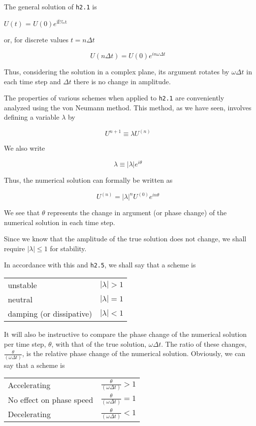 The general solution of \texttt{h2.1} is

\(U\left( t \right)\) = \(U\left( 0 \right)e^{\text{iÏt}}\)

or, for discrete values \(t = n\Delta t\)

{\[U( n \Delta t ) = U( 0 )e^{i n \omega \Delta t}\]}

Thus, considering the solution in a complex plane, its argument rotates
by \(\omega\Delta t\) in each time step and \(\Delta t\) there is no
change in amplitude.

The properties of various schemes when applied to \texttt{h2.1} are
conveniently analyzed using the von Neumann method. This method, as we
have seen, involves defining a variable \(\lambda\) by

{\[U^{n + 1} \equiv \lambda U^{\left( n \right)}\]}

We also write

{\[\lambda \equiv | \lambda |e^{i\theta}\]}

Thus, the numerical solution can formally be written as

{\[U^{( n )} = | \lambda |^{n}U^{( 0 )}e^{i n \theta}\]}

We see that \(\theta\) represents the change in argument (or phase
change) of the numerical solution in each time step.

Since we know that the amplitude of the true solution does not change,
we shall require \(| \lambda | \leq 1\) for stability.

In accordance with this and \texttt{h2.5}, we shall say that a scheme is

\begin{longtable}[]{@{}ll@{}}
\toprule\noalign{}
\endhead
\bottomrule\noalign{}
\endlastfoot
unstable & \(| \lambda | > 1\) \\
neutral & \(| \lambda | = 1\) \\
damping (or dissipative) & \(| \lambda | < 1\) \\
\end{longtable}

It will also be instructive to compare the phase change of the numerical
solution per time step, \(\theta\), with that of the true solution,
\(\omega\Delta t\). The ratio of these changes,
\(\frac{\theta}{(\omega \Delta t)}\), is the relative phase change of
the numerical solution. Obviously, we can say that a scheme is

\begin{longtable}[]{@{}ll@{}}
\toprule\noalign{}
\endhead
\bottomrule\noalign{}
\endlastfoot
Accelerating & \(\frac{\theta}{(\omega \Delta t)} > 1\) \\
No effect on phase speed & \(\frac{\theta}{(\omega \Delta t)} = 1\) \\
Decelerating & \(\frac{\theta}{(\omega \Delta t)} < 1\) \\
\end{longtable}

